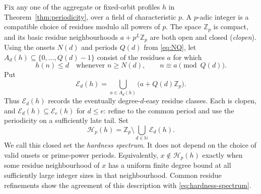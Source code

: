 \documentclass[11pt,a4paper]{article}
\theoremstyle{definition}\newtheorem{definition}[theorem]{Definition}
\theoremstyle{remark}\newtheorem{remark}[theorem]{Remark}
\begin{document}
Fix any one of the aggregate or fixed-orbit profiles $h$ in
Theorem~\ref{thm:periodicity}, over a field of characteristic $p$.
A $p$-adic integer is a compatible choice of residues modulo all powers
of $p$. The space $\mathbb Z_p$ is compact, and its basic residue
neighbourhoods $a+p^L\mathbb Z_p$ are both open and closed
(\emph{clopen}). Using the onsets $N(d)$ and periods $Q(d)$ from
\eqref{eq:NQ}, let $A_d(h)\subseteq\{0,\ldots,Q(d)-1\}$ consist of
the residues $a$ for which
\[
 h(n)\le d\quad\text{whenever }n\ge N(d),\qquad
                         n\equiv a\pmod{Q(d)}.
\]
Put
\[
 \mathcal E_d(h)=\bigcup_{a\in A_d(h)}
                         \bigl(a+Q(d)\mathbb Z_p\bigr).
\]
Thus $\mathcal E_d(h)$ records the eventually degree-$d$-easy residue
classes. Each is clopen, and $\mathcal E_d(h)\subseteq\mathcal E_e(h)$
for $d\le e$: refine to the common period and use the periodicity on a
sufficiently late tail. Set
\begin{equation}\label{eq:hardness-spectrum}
 \mathcal H_p(h)=\mathbb Z_p\setminus
                    \bigcup_{d\in\mathbb N}\mathcal E_d(h).
\end{equation}
We call this closed set the \emph{hardness spectrum}. It does not depend
on the choice of valid onsets or prime-power periods. Equivalently,
$x\notin\mathcal H_p(h)$ exactly when some residue neighbourhood of
$x$ has a uniform finite degree bound at all sufficiently large integer
sizes in that neighbourhood. Common residue refinements show the
agreement of this description with \eqref{eq:hardness-spectrum}.
\end{document}
